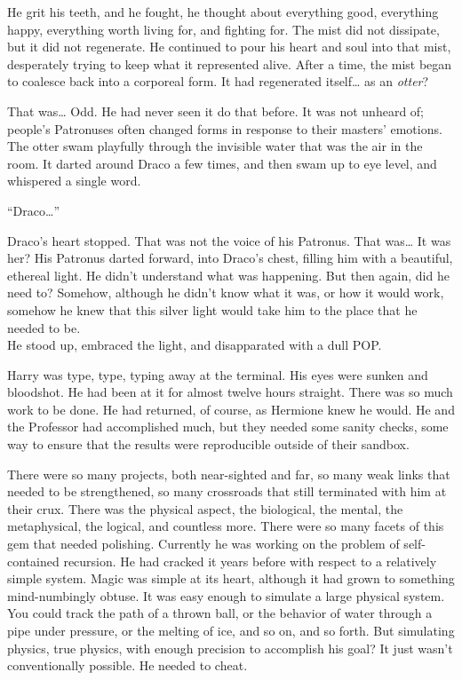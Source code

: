 He grit his teeth, and he fought, he thought about everything good, everything happy, everything worth living for, and fighting for. The mist did not dissipate, but it did not regenerate. He continued to pour his heart and soul into that mist, desperately trying to keep what it represented alive. After a time, the mist began to coalesce back into a corporeal form.
\SmallVSpace
It had regenerated itself… as an \emph{otter}?


That was… Odd. He had never seen it do that before. It was not unheard of; people’s Patronuses often changed forms in response to their masters’ emotions. The otter swam playfully through the invisible water that was the air in the room. It darted around Draco a few times, and then swam up to eye level, and whispered a single word.

“Draco…”

Draco’s heart stopped. That was not the voice of his Patronus. That was… It was her? His Patronus darted forward, into Draco’s chest, filling him with a beautiful, ethereal light. He didn’t understand what was happening. But then again, did he need to? Somehow, although he didn’t know what it was, or how it would work, somehow he knew that this silver light would take him to the place that he needed to be.\\

He stood up, embraced the light, and disapparated with a dull POP.

\simpleline
{}

Harry was type, type, typing away at the terminal. His eyes were sunken and bloodshot. He had been at it for almost twelve hours straight. There was so much work to be done. He had returned, of course, as Hermione knew he would. He and the Professor had accomplished much, but they needed some sanity checks, some way to ensure that the results were reproducible outside of their sandbox.

There were so many projects, both near-sighted and far, so many weak links that needed to be strengthened, so many crossroads that still terminated with him at their crux. There was the physical aspect, the biological, the mental, the metaphysical, the logical, and countless more. There were so many facets of this gem that needed polishing.
\SmallVSpace
Currently he was working on the problem of self-contained recursion. He had cracked it years before with respect to a relatively simple system. Magic was simple at its heart, although it had grown to something mind-numbingly obtuse. It was easy enough to simulate a large physical system. You could track the path of a thrown ball, or the behavior of water through a pipe under pressure, or the melting of ice, and so on, and so forth. But simulating physics, true physics, with enough precision to accomplish his goal? It just wasn’t conventionally possible. He needed to cheat.


